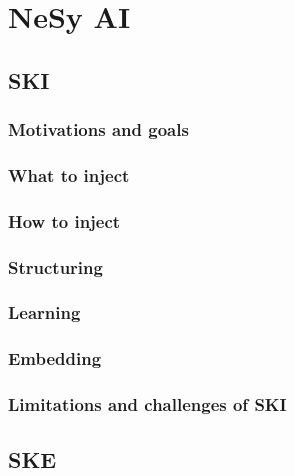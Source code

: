 
\chapter{\Acl{NeSy} \ac{AI}}
\label{ch:nesy-ai}

\section{\Acl{SKI}}\label{sec:ski}

\subsection{Motivations and goals}\label{subsec:ski-motivations-and-goals}

\subsection{What to inject}\label{subsec:what-to-inject}

\subsection{How to inject}\label{subsec:how-to-inject}

\subsection{Structuring}\label{subsec:structuring}

\subsection{Learning}\label{subsec:learning}

\subsection{Embedding}\label{subsec:ski-embedding}

\subsection{Limitations and challenges of \ac{SKI}}\label{subsec:limitations-and-challenges-of-ski}

\section{\Acl{SKE}}\label{sec:ske}

